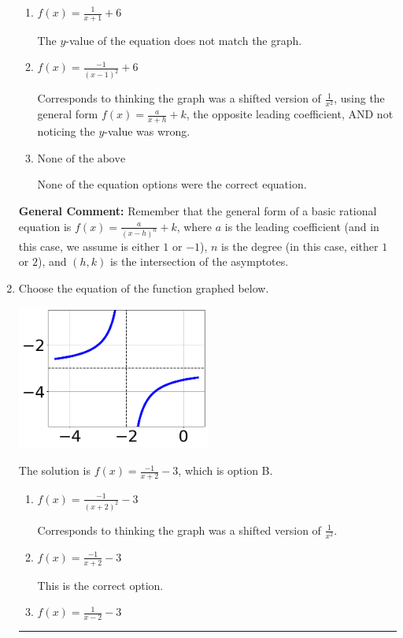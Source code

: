 \documentclass{extbook}[14pt]
\newcommand{\litem}[1]{\item #1

\rule{\textwidth}{0.4pt}}
\begin{document}
\begin{enumerate}
{\begin{enumerate}[label=\Alph*.]
Corresponds to using the general form $f(x) = \frac{a}{x+h}+k$, the opposite leading coefficient AND not noticing the $y$-value was wrong.
\item \( f(x) = \frac{1}{x + 1} + 6 \)

The $y$-value of the equation does not match the graph.
\item \( f(x) = \frac{-1}{(x - 1)^2} + 6 \)

Corresponds to thinking the graph was a shifted version of $\frac{1}{x^2}$, using the general form $f(x) = \frac{a}{x+h}+k$, the opposite leading coefficient, AND not noticing the $y$-value was wrong.
\item \( \text{None of the above} \)

None of the equation options were the correct equation.
\end{enumerate}

\textbf{General Comment:} Remember that the general form of a basic rational equation is $ f(x) = \frac{a}{(x-h)^n} + k$, where $a$ is the leading coefficient (and in this case, we assume is either $1$ or $-1$), $n$ is the degree (in this case, either $1$ or $2$), and $(h, k)$ is the intersection of the asymptotes.
}
\litem{
Choose the equation of the function graphed below.

\begin{center}
    \includegraphics[width=0.5\textwidth]{../Figures/rationalGraphToEquationB.png}
\end{center}


The solution is \( f(x) = \frac{-1}{x + 2} - 3 \), which is option B.\begin{enumerate}[label=\Alph*.]
\item \( f(x) = \frac{-1}{(x + 2)^2} - 3 \)

Corresponds to thinking the graph was a shifted version of $\frac{1}{x^2}$.
\item \( f(x) = \frac{-1}{x + 2} - 3 \)

This is the correct option.
\item \( f(x) = \frac{1}{x - 2} - 3 \)


\end{enumerate}}
\end{enumerate}
\end{document}
